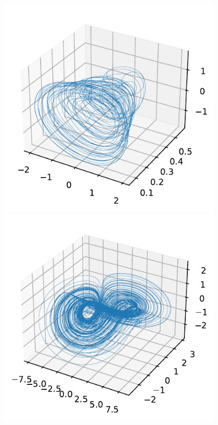 \documentclass[pdf, hyperref={unicode}, aspectratio=169]{beamer}
\begin{document}
\begin{frame}
\begin{figure}
\includegraphics[height=0.38\textheight]{img/aritmic}\hfill
\includegraphics[height=0.38\textheight]{img/simple_3d_model}
\end{figure}
\end{frame}
\end{document}
